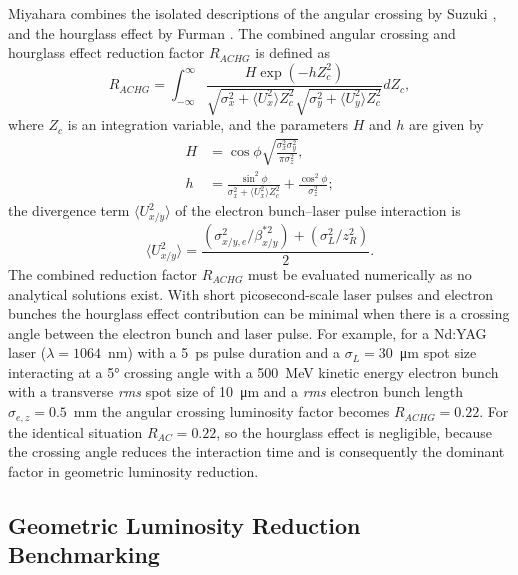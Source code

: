\documentclass[../main.tex]{subfiles}
\begin{document}
Miyahara \cite{miyahara2008luminosity} combines the isolated descriptions of the angular crossing by Suzuki \cite{suzuki1976general}, and the hourglass effect by Furman \cite{furman1991hourglass}. The combined angular crossing and hourglass effect reduction factor $R_{ACHG}$ is defined as
\begin{equation}
R_{ACHG} = \int_{-\infty}^{\infty}\frac{H\exp\left(-hZ_{c}^{2}\right)}{\sqrt{\sigma_{x}^{2}+\langle U_{x}^2\rangle Z_{c}^{2}}\sqrt{\sigma_{y}^{2}+\langle U_{y}^{2}\rangle Z_{c}^{2}}}dZ_{c},
\label{eq:miyahara_combined_reduction}    
\end{equation}
where $Z_{c}$ is an integration variable, and the parameters $H$ and $h$ are given by
\begin{align}
H &= \cos\phi\sqrt{\frac{\sigma_{x}^{2}\sigma_{y}^{2}}{\pi\sigma_{z}^{2}}},
\label{eq:miyahara_H_parameter} \\
h &= \frac{\sin^{2}\phi}{\sigma_{x}^{2}+\langle U_{x}^{2}\rangle Z_{c}^{2}}+\frac{\cos^{2}\phi}{\sigma_{z}^{2}};
\label{eq:miyahara_h_parameter}
\end{align}
the divergence term $\langle U_{x/y}^{2}\rangle$ of the electron bunch--laser pulse interaction is
\begin{equation}
\langle U_{x/y}^{2}\rangle = \frac{\left(\sigma_{x/y,e}^{2}/\beta_{x/y}^{*2}\right)+\left(\sigma_{L}^{2}/z_{R}^{2}\right)}{2}.    
\end{equation}
The combined reduction factor $R_{ACHG}$ must be evaluated numerically as no analytical solutions exist. With short picosecond-scale laser pulses and electron bunches the hourglass effect contribution can be minimal when there is a crossing angle between the electron bunch and laser pulse. For example, for a Nd:YAG laser ($\lambda = 1064$~\si{\nano\meter}) with a 5~\si{\pico\second} pulse duration and a $\sigma_{L} = 30$~\si{\micro\meter} spot size interacting at a 5\si{\degree} crossing angle with a 500~\si{\mega\electronvolt} kinetic energy electron bunch with a transverse \textit{rms} spot size of 10~\si{\micro\meter} and a \textit{rms} electron bunch length $\sigma_{e,z} = 0.5$~\si{\milli\meter} the angular crossing luminosity factor becomes $R_{ACHG} = 0.22$. For the identical situation $R_{AC} = 0.22$, so the hourglass effect is negligible, because the crossing angle reduces the interaction time and is consequently the dominant factor in geometric luminosity reduction.

\subsection{Geometric Luminosity Reduction Benchmarking}
\end{document}
